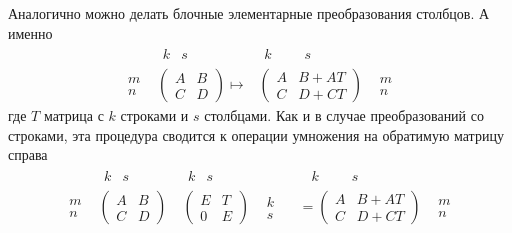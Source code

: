 Аналогично можно делать блочные элементарные преобразования столбцов.
А именно
\[
\begin{matrix}
{}&{
\begin{matrix}
{k}&{s\phantom{dd}}
\end{matrix}}\\
{
\begin{matrix}
{m}\\
{n}
\end{matrix}}&{
\begin{pmatrix}
{A}&{B}\\
{C}&{D}
\end{pmatrix}\mapsto}
\end{matrix}
\begin{matrix}
{
\begin{matrix}
{k}&{\phantom{ddd}s\phantom{dd}}
\end{matrix}
}&{
}\\
{
\begin{pmatrix}
{A}&{B + AT}\\
{C}&{D + CT}
\end{pmatrix}
}&{
\begin{matrix}
{m}\\
{n}
\end{matrix}
}
\end{matrix}
\]
где $T$ матрица с $k$ строками и $s$ столбцами.
Как и в случае преобразований со строками, эта процедура сводится к операции умножения на обратимую матрицу справа
\[
\begin{matrix}
{}&{
\begin{matrix}
{k}&{s}
\end{matrix}}\\
{
\begin{matrix}
{m}\\
{n}
\end{matrix}}&{
\begin{pmatrix}
{A}&{B}\\
{C}&{D}
\end{pmatrix}}
\end{matrix}
\;
\begin{matrix}
{
\begin{matrix}
{k}&{s}
\end{matrix}
}&{
}\\
{
\begin{pmatrix}
{E}&{T}\\
{0}&{E}
\end{pmatrix}
}&{
\begin{matrix}
{k}\\
{s}
\end{matrix}
}
\end{matrix}
\;\;
\begin{matrix}
{
\begin{matrix}
{\phantom{d}k}&{\phantom{ddd}s\phantom{dd}}
\end{matrix}
}&{
}\\
{
=
\begin{pmatrix}
{A}&{B + AT}\\
{C}&{D + CT}
\end{pmatrix}
}&{
\begin{matrix}
{m}\\
{n}
\end{matrix}
}
\end{matrix}
\]
